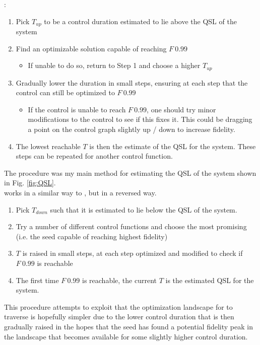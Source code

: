 \documentclass[a4paper, twocolumn]{revtex4-1}
\begin{document}
:
\begin{enumerate}
	\item Pick $T_{up}$ to be a control duration estimated to lie above the QSL of the system
	\item Find an optimizable solution capable of reaching $F~0.99$
	\begin{itemize}
		\item If unable to do so, return to Step 1 and choose a higher $T_{up}$
	\end{itemize}
	\item Gradually lower the duration in small steps, ensuring at each step that the control can still be optimized to $F~0.99$
	\begin{itemize}
		\item If the control is unable to reach $F~0.99$, one should try minor modifications to the control to see if this fixes it. This could be dragging a point on the control graph slightly up / down to increase fidelity.
	\end{itemize}
	\item The lowest reachable $T$ is then the estimate of the QSL for the system. These steps can be repeated for another control function.
\end{enumerate}
The  procedure was my main method for estimating the QSL of the system shown in Fig. \ref{fig:QSL}.\\

 works in a similar way to , but in a reversed way.
\begin{enumerate}
	\item Pick $T_{down}$ such that it is estimated to lie below the QSL of the system.
	\item Try a number of different control functions and choose the most promising (i.e. the seed capable of reaching highest fidelity)
	\item $T$ is raised in small steps, at each step optimized and modified to check if $F~0.99$ is reachable
	\item The first time $F~0.99$ is reachable, the current $T$ is the estimated QSL for the system.
\end{enumerate}
This procedure attempts to exploit that the optimization landscape for  to traverse is hopefully simpler due to the lower control duration that is then gradually raised in the hopes that the seed has found a potential fidelity peak in the landscape that becomes available for some slightly higher control duration.
\end{document}
